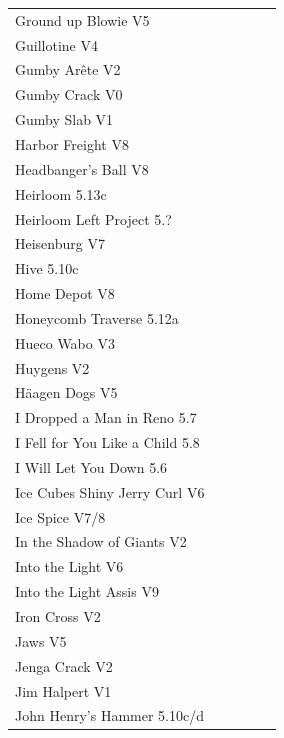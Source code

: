 \begin{flushleft}
\begin{center}
\begin{supertabular}{p{0.76\linewidth}p{0.08\linewidth}}
Ground up Blowie V5 & \pageref{rt:Ground up Blowie} \\
Guillotine V4 & \pageref{rt:Guillotine} \\
Gumby Arête V2 & \pageref{rt:Gumby Arête} \\
Gumby Crack V0 & \pageref{rt:Gumby Crack} \\
Gumby Slab V1 & \pageref{rt:Gumby Slab} \\
Harbor Freight V8 & \pageref{vr:Harbor Freight} \\
Headbanger's Ball V8 & \pageref{rt:Hanging Prow Project} \\
Heirloom 5.13c & \pageref{rt:Heirloom} \\
Heirloom Left Project 5.? & \pageref{vr:Heirloom Left Project} \\
Heisenburg V7 & \pageref{rt:Heisenburg} \\
Hive 5.10c & \pageref{rt:Hive} \\
Home Depot V8 & \pageref{vr:Harbor Freight Right Exit} \\
Honeycomb Traverse 5.12a & \pageref{vr:Honeycomb Traverse} \\
Hueco Wabo V3 & \pageref{rt:Hueco Wabo} \\
Huygens V2 & \pageref{rt:Huygens} \\
Häagen Dogs V5 & \pageref{rt:Häagen Dogs} \\
I Dropped a Man in Reno 5.7 & \pageref{rt:I Dropped a Man in Reno} \\
I Fell for You Like a Child 5.8 & \pageref{rt:I Fell for You Like a Child} \\
I Will Let You Down 5.6 & \pageref{rt:I Will Let You Down} \\
Ice Cubes Shiny Jerry Curl V6 & \pageref{rt:Ice Cubes Shiny Jerry Curl} \\
Ice Spice V7/8 & \pageref{vr:Ice Spice} \\
In the Shadow of Giants V2 & \pageref{rt:In the Shadow of Giants} \\
Into the Light V6 & \pageref{rt:Into the Light} \\
Into the Light Assis V9 & \pageref{vr:Into the Light Assis} \\
Iron Cross V2 & \pageref{vr:Iron Cross} \\
Jaws V5 & \pageref{rt:Jaws} \\
Jenga Crack V2 & \pageref{vr:Crack 2} \\
Jim Halpert V1 & \pageref{rt:Jim Halpert} \\
John Henry's Hammer 5.10c/d & \pageref{rt:John Henry's Hammer} \\

\end{supertabular}
\end{center}
\end{flushleft}
